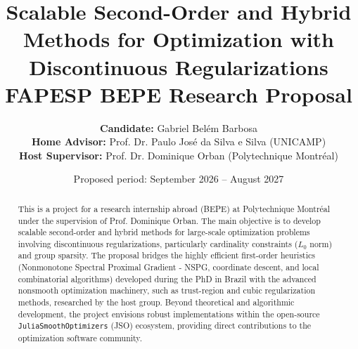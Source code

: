 \documentclass[11pt,a4paper]{article}
\title{\textbf{Scalable Second-Order and Hybrid Methods for Optimization with Discontinuous Regularizations}\\
\large FAPESP BEPE Research Proposal}
\author{
    \textbf{Candidate:} Gabriel Belém Barbosa \\
    \textbf{Home Advisor:} Prof. Dr. Paulo José da Silva e Silva (UNICAMP) \\
    \textbf{Host Supervisor:} Prof. Dr. Dominique Orban (Polytechnique Montréal)
}
\date{Proposed period: September 2026 -- August 2027}
\begin{document}
\maketitle

\begin{abstract}
This is a project for a research internship abroad (BEPE) at Polytechnique Montréal under the supervision of Prof. Dominique Orban. The main objective is to develop scalable second-order and hybrid methods for large-scale optimization problems involving discontinuous regularizations, particularly cardinality constraints ($L_0$ norm) and group sparsity. The proposal bridges the highly efficient first-order heuristics (Nonmonotone Spectral Proximal Gradient - NSPG, coordinate descent, and local combinatorial algorithms) developed during the PhD in Brazil with the advanced nonsmooth optimization machinery, such as trust-region and cubic regularization methods, researched by the host group. Beyond theoretical and algorithmic development, the project envisions robust implementations within the open-source \texttt{JuliaSmoothOptimizers} (JSO) ecosystem, providing direct contributions to the optimization software community.
\end{abstract}

\tableofcontents
\newpage








\end{document}
